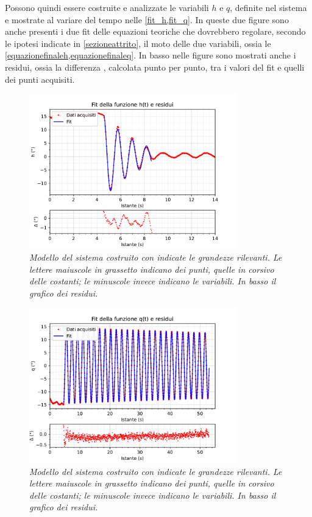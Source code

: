 \documentclass[11pt, a4paper, twoside, italian]{article}
\begin{document}
Possono quindi essere costruite e analizzate le variabili $h$ e $q$, definite nel sistema 
e mostrate al variare del tempo nelle \cref{fit_h,fit_q}.
In queste due figure sono anche presenti i due fit delle equazioni teoriche che dovrebbero regolare,
secondo le ipotesi indicate in \cref{sezioneattrito}, il moto delle due variabili, ossia le \cref{equazionefinaleh,equazionefinaleq}.
In basso nelle figure sono mostrati anche i residui, ossia la differenza
, calcolata punto per punto, tra i valori del fit e quelli dei punti acquisiti.
\begin{figure}[h!]
  \centering
  \includegraphics[width=0.8\textwidth]{../../media/plot/fit_h.pdf}
  \caption{\textit{Modello del sistema costruito con indicate
   le grandezze rilevanti. Le lettere maiuscole in grassetto indicano dei punti, quelle in corsivo delle 
   costanti; le minuscole invece indicano le variabili. In basso il grafico dei residui.} }
  \label{fit_h}
\end{figure}

\begin{figure}[h!]
  \centering
  \includegraphics[width=0.8\textwidth]{../../media/plot/fit_q.pdf}
  \caption{\textit{Modello del sistema costruito con indicate
   le grandezze rilevanti. Le lettere maiuscole in grassetto indicano dei punti, quelle in corsivo delle 
   costanti; le minuscole invece indicano le variabili. In basso il grafico dei residui.} }
  \label{fit_q}
\end{figure}
\end{document}
